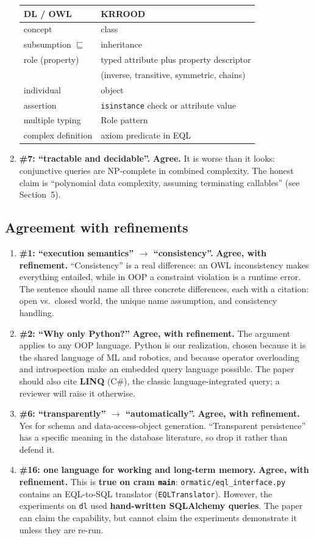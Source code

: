 \documentclass[11pt]{article}
\newcommand{\code}[1]{\texttt{#1}}
\newcommand{\agree}{\textcolor{ok}{\textbf{Agree.}}}
\newcommand{\refine}{\textcolor{accent}{\textbf{Agree, with refinement.}}}
\begin{document}
\begin{enumerate}[label=\textbf{3.\arabic*}]
\begin{center}
  \begin{tabular}{ll}
  \toprule
  DL / OWL & KRROOD\\
  \midrule
  concept & class\\
  subsumption $\sqsubseteq$ & inheritance\\
  role (property) & typed attribute plus property descriptor\\
   & (inverse, transitive, symmetric, chains)\\
  individual & object\\
  assertion & \code{isinstance} check or attribute value\\
  multiple typing & Role pattern\\
  complex definition & axiom predicate in EQL\\
  \bottomrule
  \end{tabular}
  \end{center}
  \item \textbf{\#7: ``tractable and decidable''.} \agree{} It is worse than it looks: conjunctive queries are NP-complete in combined complexity. The honest claim is ``polynomial data complexity, assuming terminating callables'' (see Section~5).
\end{enumerate}

\subsection{Agreement with refinements}
\begin{enumerate}[label=\textbf{3.\arabic*},resume]
  \item \textbf{\#1: ``execution semantics'' $\to$ ``consistency''.} \refine{} ``Consistency'' is a real difference: an OWL inconsistency makes everything entailed, while in OOP a constraint violation is a runtime error. The sentence should name all three concrete differences, each with a citation: open vs.\ closed world, the unique name assumption, and consistency handling.
  \item \textbf{\#2: ``Why only Python?''} \refine{} The argument applies to any OOP language. Python is our realization, chosen because it is the shared language of ML and robotics, and because operator overloading and introspection make an embedded query language possible. The paper should also cite \textbf{LINQ} (C\#), the classic language-integrated query; a reviewer will raise it otherwise.
  \item \textbf{\#6: ``transparently'' $\to$ ``automatically''.} \refine{} Yes for schema and data-access-object generation. ``Transparent persistence'' has a specific meaning in the database literature, so drop it rather than defend it.
  \item \textbf{\#16: one language for working and long-term memory.} \refine{} This is \textbf{true on cram \code{main}}: \code{ormatic/eql\_interface.py} contains an EQL-to-SQL translator (\code{EQLTranslator}). However, the experiments on \code{dl} used \textbf{hand-written SQLAlchemy queries}. The paper can claim the capability, but cannot claim the experiments demonstrate it unless they are re-run.
\end{enumerate}
\end{document}

